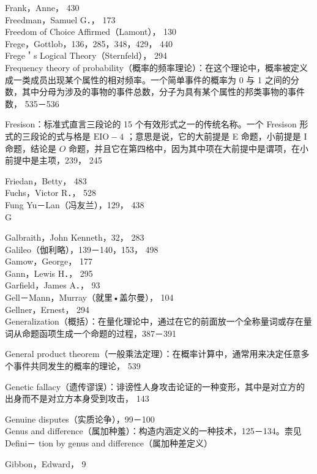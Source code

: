 Frank，Anne， 430\\
Freedman，Samuel G．， 173\\
Freedom of Choice Affirmed（Lamont）， 130\\
Frege，Gottlob，136，285，348，429， 440\\
Frege＇s Logical Theory（Sternfeld）， 294\\
Frequency theory of probability（概率的频率理论）：在这个理论中，概率被定义成一类成员出现某个属性的相对频率。一个简单事件的概率为 0 与 1 之间的分数，其中分母为涉及的事物的事件总数，分子为具有某个属性的邦类事物的事件数， 535－536

Fresison：标准式直言三段论的 15 个有效形式之一的传统名称。一个 Fresison 形式的三段论的式与格是 $\mathrm{EIO}-4$ ；意思是说，它的大前提是 E 命题，小前提是 I 命题，结论是 $O$ 命题，并且它在第四格中，因为其中项在大前提中是谓项，在小前提中是主项，239， 245

Friedan，Betty， 483\\
Fuchs，Victor R．， 528\\
Fung Yu－Lan（冯友兰），129， 438\\
G

Galbraith，John Kenneth，32， 283\\
Galileo（伽利略），139－140，153， 498\\
Gamow，George， 177\\
Gann，Lewis H．， 295\\
Garfield，James A．， 93\\
Gell－Mann，Murray（就里•盖尔曼）， 104\\
Gellner，Ernest， 294\\
Generalization（概括）：在量化理论中，通过在它的前面放一个全称量词或存在量词从命题函项生成一个命题的过程，387－391

General product theorem（一般乘法定理）：在概率计算中，通常用来决定任意多个事件共同发生的概率的理论， 539

Genetic fallacy（遗传谬误）：诽谤性人身攻击论证的一种变形，其中是对立方的出身而不是对立方本身受到攻击， 143

Genuine disputes（实质论争），99－100\\
Genus and difference（属加种羞）：构造内涵定义的一种技术，125－134。柰见 Defini－ tion by genus and difference（属加种差定义）

Gibbon，Edward， 9

